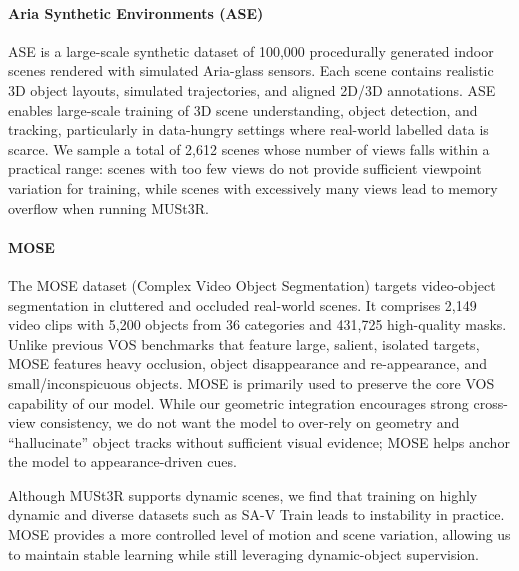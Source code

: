 \paragraph{Aria Synthetic Environments (ASE)~\cite{avetisyan2024scenescript}}
ASE is a large-scale synthetic dataset of 100,000 procedurally generated indoor scenes rendered with simulated Aria-glass sensors. Each scene contains realistic 3D object layouts, simulated trajectories, and aligned 2D/3D annotations.
ASE enables large-scale training of 3D scene understanding, object detection, and tracking, particularly in data-hungry settings where real-world labelled data is scarce. 
We sample a total of 2{,}612 scenes whose number of views falls within a practical range:  
scenes with too few views do not provide sufficient viewpoint variation for training,  
while scenes with excessively many views lead to memory overflow when running MUSt3R. 

\paragraph{MOSE~\cite{MOSE}}
The MOSE dataset (Complex Video Object Segmentation) targets video-object segmentation in cluttered and occluded real-world scenes. It comprises 2,149 video clips with 5,200 objects from 36 categories and 431,725 high-quality masks.  
Unlike previous VOS benchmarks that feature large, salient, isolated targets, MOSE features heavy occlusion, object disappearance and re-appearance, and small/inconspicuous objects.
MOSE is primarily used to preserve the core VOS capability of our model.  
While our geometric integration encourages strong cross-view consistency, we do not want the model to over-rely on geometry and ``hallucinate'' object tracks without sufficient visual evidence; MOSE helps anchor the model to appearance-driven cues.  

Although MUSt3R supports dynamic scenes, we find that training on highly dynamic and diverse datasets such as SA-V Train leads to instability in practice. MOSE provides a more controlled level of motion and scene variation, allowing us to maintain stable learning while still leveraging dynamic-object supervision.


